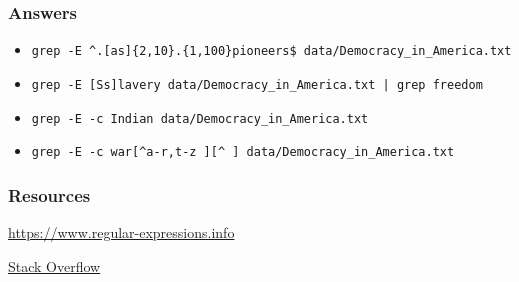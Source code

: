 \documentclass{beamer}
\newcommand{\code}[1]{\colorbox{codegray}{\texttt{#1}}}
\begin{document}
\begin{frame}
\frametitle{Answers}
\begin{itemize}
    \item \code{grep -E \^{}.[as]\{2,10\}.\{1,100\}pioneers\$ data/Democracy\_in\_America.txt}
    \pause
    \item \code{grep -E [Ss]lavery data/Democracy\_in\_America.txt  | grep freedom}
    \pause
    \item \code{grep -E -c Indian data/Democracy\_in\_America.txt}
    \pause
    \item \code{grep -E -c war[\^{}a-r,t-z\ ][\^{}\ ] data/Democracy\_in\_America.txt}
\end{itemize}
\end{frame}






\begin{frame}
\frametitle{Resources}

\href{https://www.regular-expressions.info/}{https://www.regular-expressions.info}

\href{https://stackoverflow.com/}{Stack Overflow}

\end{frame}
\end{document}
